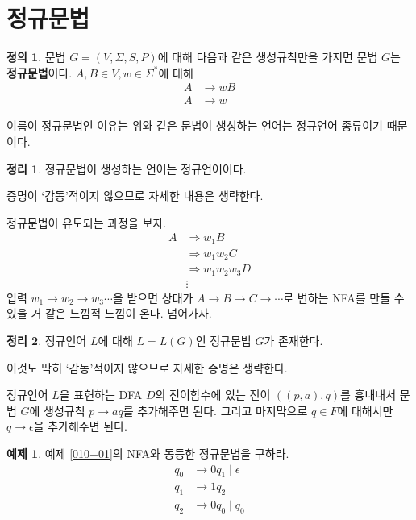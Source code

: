 \documentclass[b5paper]{book}
\theoremstyle{definition}
\newtheorem{defn}{정의}[chapter]
\newtheorem{thm}{정리}[chapter]
\newtheorem{ex}{예제}[chapter]
\newenvironment{pf*}{\pushQED{\qed}\pf}{\popQED\endpf}
\begin{document}
\section{정규문법}
\begin{defn} 
문법 $G = (V, \Sigma, S, P)$에 대해 다음과 같은 생성규칙만을 가지면 문법 
$G$는 \textbf{정규문법}이다. $A,B \in V, w \in \Sigma^{*}$에 대해 
\begin{align*}
    A &\rightarrow wB \\ 
    A &\rightarrow w
\end{align*}
\end{defn}
이름이 정규문법인 이유는 위와 같은 문법이 생성하는 언어는 정규언어 종류이기 때문이다.
\begin{thm}
정규문법이 생성하는 언어는 정규언어이다.
\end{thm}
\begin{pf*}
증명이 `감동'적이지 않으므로 자세한 내용은 생략한다.

정규문법이 유도되는 과정을 보자. 
\begin{align*}
    A &\Rightarrow w_1 B \\ 
    & \Rightarrow w_1w_2 C \\ 
    & \Rightarrow w_1w_2w_3 D \\ 
    & \vdots
\end{align*}
입력 $w_1\rightarrow w_2 \rightarrow w_3 \cdots$을 받으면 
상태가 $A \rightarrow B \rightarrow C \rightarrow \cdots$로 변하는 NFA를
만들 수 있을 거 같은 느낌적 느낌이 온다. 넘어가자.
\end{pf*}
\begin{thm}
    정규언어 $L$에 대해 $L = L(G)$인 정규문법 $G$가 존재한다. 
\end{thm}
\begin{pf*}
    이것도 딱히 `감동'적이지 않으므로 자세한 증명은 생략한다. 
    
    정규언어 $L$을 표현하는 DFA $D$의 전이함수에 있는 전이
    $((p, a), q)$를 흉내내서 문법 $G$에 생성규칙 $p \rightarrow aq$를 추가해주면 된다.
    그리고 마지막으로 $q \in F$에 대해서만 $q \rightarrow \epsilon$을 추가해주면 된다.
\end{pf*}
\begin{ex}
    예제 \ref{010+01}의 NFA와 동등한 정규문법을 구하라. 
    \begin{align*}
        q_0 & \rightarrow 0q_1 \; \vert \; \epsilon \\ 
        q_1 & \rightarrow 1q_2 \\ 
        q_2 & \rightarrow 0q_0 \; \vert \; q_0
    \end{align*}
\end{ex}
\end{document}
